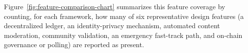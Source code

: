     

 Figure~\ref{fig:feature-comparison-chart} summarizes this feature coverage by counting, for each framework, how many of six representative design features (a decentralized ledger, an identity-privacy mechanism, automated content moderation, community validation, an emergency fast-track path, and on-chain governance or polling) are reported as present.

